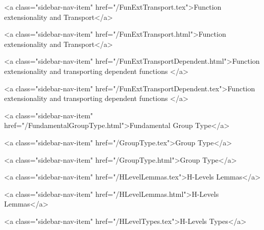       
    
      
        
          <a class="sidebar-nav-item" href="/FunExtTransport.tex">Function extensionality and Transport</a>
        
      
    
      
        
          <a class="sidebar-nav-item" href="/FunExtTransport.html">Function extensionality and Transport</a>
        
      
    
      
        
          <a class="sidebar-nav-item" href="/FunExtTransportDependent.html">Function extensionality and transporting dependent functions </a>
        
      
    
      
        
          <a class="sidebar-nav-item" href="/FunExtTransportDependent.tex">Function extensionality and transporting dependent functions </a>
        
      
    
      
        
          <a class="sidebar-nav-item" href="/FundamentalGroupType.html">Fundamental Group Type</a>
        
      
    
      
        
          <a class="sidebar-nav-item" href="/GroupType.tex">Group Type</a>
        
      
    
      
        
          <a class="sidebar-nav-item" href="/GroupType.html">Group Type</a>
        
      
    
      
        
          <a class="sidebar-nav-item" href="/HLevelLemmas.tex">H-Levels Lemmas</a>
        
      
    
      
        
          <a class="sidebar-nav-item" href="/HLevelLemmas.html">H-Levels Lemmas</a>
        
      
    
      
        
          <a class="sidebar-nav-item" href="/HLevelTypes.tex">H-Levels Types</a>
        
      
    

